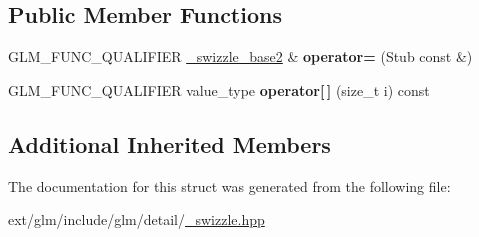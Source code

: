 \subsection*{Public Member Functions}
\begin{DoxyCompactItemize}
\item 
\hypertarget{structglm_1_1detail_1_1__swizzle__base2_3_01_value_type_00_01_p_00_01_vec_type_00_01_n_00_01_e0_fc19218d69dc8988a4a57fbe7f79725c_aed2b7223090d020e28af46eb33fe6729}{G\-L\-M\-\_\-\-F\-U\-N\-C\-\_\-\-Q\-U\-A\-L\-I\-F\-I\-E\-R \hyperlink{structglm_1_1detail_1_1__swizzle__base2}{\-\_\-swizzle\-\_\-base2} \& {\bfseries operator=} (Stub const \&)}\label{structglm_1_1detail_1_1__swizzle__base2_3_01_value_type_00_01_p_00_01_vec_type_00_01_n_00_01_e0_fc19218d69dc8988a4a57fbe7f79725c_aed2b7223090d020e28af46eb33fe6729}

\item 
\hypertarget{structglm_1_1detail_1_1__swizzle__base2_3_01_value_type_00_01_p_00_01_vec_type_00_01_n_00_01_e0_fc19218d69dc8988a4a57fbe7f79725c_a2f3a45edbb24ca7e12182c3123dde632}{G\-L\-M\-\_\-\-F\-U\-N\-C\-\_\-\-Q\-U\-A\-L\-I\-F\-I\-E\-R value\-\_\-type {\bfseries operator\mbox{[}$\,$\mbox{]}} (size\-\_\-t i) const }\label{structglm_1_1detail_1_1__swizzle__base2_3_01_value_type_00_01_p_00_01_vec_type_00_01_n_00_01_e0_fc19218d69dc8988a4a57fbe7f79725c_a2f3a45edbb24ca7e12182c3123dde632}

\end{DoxyCompactItemize}
\subsection*{Additional Inherited Members}


The documentation for this struct was generated from the following file\-:\begin{DoxyCompactItemize}
\item 
ext/glm/include/glm/detail/\hyperlink{__swizzle_8hpp}{\-\_\-swizzle.\-hpp}\end{DoxyCompactItemize}
